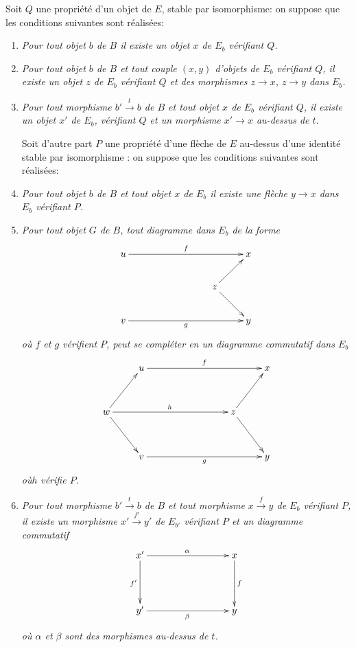 \documentclass[10pt]{../fichiers-configuration-latex/smfart}
\begin{document}
Soit $Q$ une propriété d'un objet de $E$, stable par isomorphisme: on
suppose que les conditions suivantes sont réalisées:
\begin{enumerate}
\renewcommand{\theenumi}{\alph{enumi}}
\renewcommand{\labelenumi}{\theenumi)}
\item \emph{Pour tout objet $b$ de $B$ il existe un objet $x$ de $E_b$
  vérifiant $Q$.}

\item \emph{Pour tout objet $b$ de $B$ et tout couple $(x, y)$ d'objets de
  $E_b$ vérifiant $Q$, il existe un objet $z$ de $E_b$ vérifiant $Q$
  et des morphismes $z \to x$, $z \to y$ dans $E_b$.}

\item \emph{Pour tout morphisme $b'\xrightarrow{t} b$ de $B$ et tout objet
  $x$ de $E_b$ vérifiant $Q$, il existe un objet $x'$ de $E_b$,
  vérifiant $Q$ et un morphisme $x'\to x$ au-dessus de $t$.}

Soit d'autre part $P$ une propriété d'une flèche de $E$ au-dessus
d'une identité stable par isomorphisme : on suppose que les conditions
suivantes sont réalisées:

\item \emph{Pour tout objet $b$ de $B$ et tout objet $x$ de $E_b$ il existe
  une flèche $y \to x$ dans $E_b$ vérifiant $P$.}

\item \emph{Pour tout objet $G$ de $B$, tout diagramme dans $E_b$ de la
  forme}
\[
\xymatrix{
u \ar[rrrr]^{f} & & &                 &x\\
                & & &z\ar[ru]\ar[rd] &\\
v \ar[rrrr]_{g} & & &               & y
}
\]
\emph{où $f$ et $g$ vérifient $P$, peut se compléter en un diagramme
commutatif dans $E_b$}
\[
\xymatrix@R=1.25cm{
  & u\ar[rrrr]^{f} & & &  & x\\
w\ar[rrrr]^{h}\ar[ru]\ar[rd] &   & & &z\ar[ru]\ar[rd] & \\
  & v\ar[rrrr]_{g} & & &  & y
}
\]
\emph{où}\pageoriginale $h$ \emph{vérifie $P$.}

\item \emph{Pour tout morphisme $b' \xrightarrow{t} b$ de $B$ et tout
  morphisme $x \xrightarrow{f} y$ de $E_b$ vérifiant $P$, il existe un
  morphisme $x' \xrightarrow{f'} y'$ de $E_{b'}$ vérifiant $P$ et un
  diagramme commutatif}
\[
\xymatrix@C=3cm@R=1.5cm{
x' \ar[r]^{\alpha} \ar[d]_{f'}& x\ar[d]^{f}\\
y' \ar[r]_{\beta}& y
}
\]
\emph{où $\alpha$ et $\beta$ sont des morphismes au-dessus de $t$.}
\end{enumerate}
\end{document}

